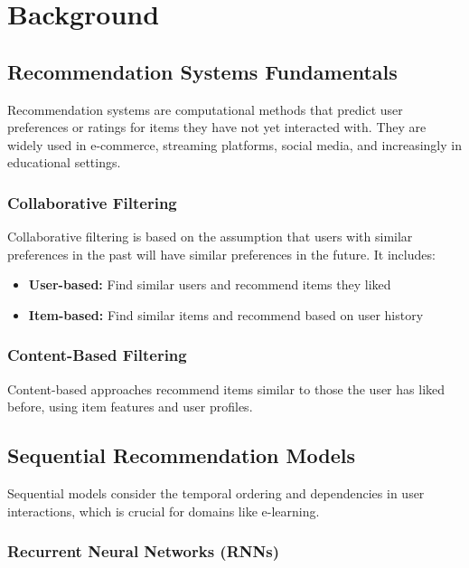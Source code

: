 
\section{Background}

\subsection{Recommendation Systems Fundamentals}

Recommendation systems are computational methods that predict user preferences or ratings for items they have not yet interacted with. They are widely used in e-commerce, streaming platforms, social media, and increasingly in educational settings.

\subsubsection{Collaborative Filtering}

Collaborative filtering is based on the assumption that users with similar preferences in the past will have similar preferences in the future. It includes:

\begin{itemize}
    \item \textbf{User-based:} Find similar users and recommend items they liked
    \item \textbf{Item-based:} Find similar items and recommend based on user history
\end{itemize}

\subsubsection{Content-Based Filtering}

Content-based approaches recommend items similar to those the user has liked before, using item features and user profiles.

\subsection{Sequential Recommendation Models}

Sequential models consider the temporal ordering and dependencies in user interactions, which is crucial for domains like e-learning.

\subsubsection{Recurrent Neural Networks (RNNs)}

